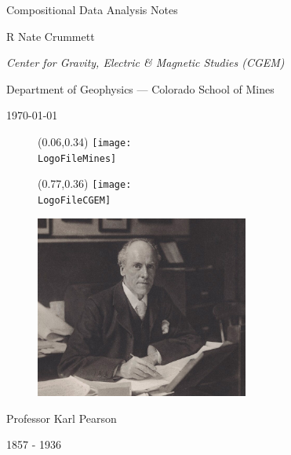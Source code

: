 \documentclass[dark]{cgem-presentation}
\begin{document}
\begin{frame}[plain]
	\begin{center}
		\vspace{1cm}
		\Huge
		Compositional Data Analysis Notes

		\vspace{1cm}
		\textcolor{SecondColor}{\huge R Nate Crummett }

		\vspace{2.5cm}
		{ \color{SecondColor}
		\itshape
		\Large
		Center for Gravity, Electric \& Magnetic Studies (CGEM)

		\vspace{-5mm}
		\large
		Department of Geophysics --- Colorado School of Mines
		}

		\vspace{2mm}
		\large
		\today
	\end{center}

	\begin{figure}
		\begin{textblock*}{2.7cm}(0.06\paperwidth,0.34\paperheight)
			\texttt{[image: \\LogoFileMines]}
		\end{textblock*}
	\end{figure}

	\begin{figure}
		\vspace*{-11.09294pt}
		\begin{textblock*}{2.85cm}(0.77\paperwidth,0.36\paperheight)
			\texttt{[image: \\LogoFileCGEM]}
		\end{textblock*}
	\end{figure}
\end{frame}

\begin{frame}[plain]
	\large
	\vspace{6mm}
	\begin{figure}
		\includegraphics[width=7cm]{pearson}
	\end{figure}
	\begin{center}
		Professor Karl Pearson

		1857 - 1936
	\end{center}
\end{frame}
\end{document}
